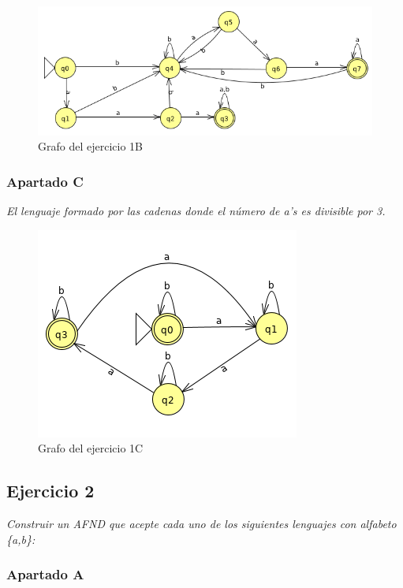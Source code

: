\begin{figure}[h]
	\centering
	\includegraphics[width=1\linewidth]{image/ejercicio2}
	\caption[prac 2 - ejer 1B]{Grafo del ejercicio 1B}
	\label{fig:ejercicio1B}
\end{figure}

\newpage

\subsubsection{Apartado C}

\textit{El lenguaje formado por las cadenas donde el número de a’s es divisible por 3.}

\begin{figure}[h]
	\centering
	\includegraphics[width=0.6\linewidth]{image/ejercicio3}
	\caption[prac 2 - ejer 1C]{Grafo del ejercicio 1C}
	\label{fig:ejercicio1C}
\end{figure}

\subsection{Ejercicio 2}

\textit{Construir un AFND que acepte cada uno de los siguientes lenguajes con alfabeto \{a,b\}:}

\subsubsection{Apartado A}

